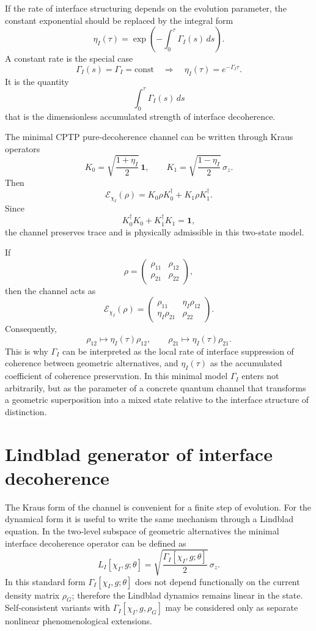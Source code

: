 \documentclass[12pt,a4paper]{article}
\newcommand{\Id}{\mathbf 1}
\begin{document}
If the rate of interface structuring depends on the evolution parameter, the constant exponential should be replaced by the integral form
\[
\boxed{
\eta_I(\tau)
=
\exp\left(-\int_0^\tau \Gamma_I(s)\,ds\right).
}
\]
A constant rate is the special case
\[
\Gamma_I(s)=\Gamma_I=\mathrm{const}
\quad\Rightarrow\quad
\eta_I(\tau)=e^{-\Gamma_I\tau}.
\]
It is the quantity
\[
\int_0^\tau \Gamma_I(s)\,ds
\]
that is the dimensionless accumulated strength of interface decoherence.

The minimal CPTP pure-decoherence channel can be written through Kraus operators
\[
\boxed{
K_0=
\sqrt{\frac{1+\eta_I}{2}}\,\Id,
\qquad
K_1=
\sqrt{\frac{1-\eta_I}{2}}\,\sigma_z.
}
\]
Then
\[
\boxed{
\mathcal E_{\chi_I}(\rho)
=
K_0\rho K_0^\dagger+K_1\rho K_1^\dagger.
}
\]
Since
\[
K_0^\dagger K_0+K_1^\dagger K_1=\Id,
\]
the channel preserves trace and is physically admissible in this two-state model.

If
\[
\rho=
\begin{pmatrix}
\rho_{11} & \rho_{12}\\
\rho_{21} & \rho_{22}
\end{pmatrix},
\]
then the channel acts as
\[
\boxed{
\mathcal E_{\chi_I}(\rho)=
\begin{pmatrix}
\rho_{11} & \eta_I\rho_{12}\\
\eta_I\rho_{21} & \rho_{22}
\end{pmatrix}.
}
\]
Consequently,
\[
\boxed{
\rho_{12}\longmapsto \eta_I(\tau)\rho_{12},
\qquad
\rho_{21}\longmapsto \eta_I(\tau)\rho_{21}.
}
\]
This is why $\Gamma_I$ can be interpreted as the local rate of interface suppression of coherence between geometric alternatives, and $\eta_I(\tau)$ as the accumulated coefficient of coherence preservation. In this minimal model $\Gamma_I$ enters not arbitrarily, but as the parameter of a concrete quantum channel that transforms a geometric superposition into a mixed state relative to the interface structure of distinction.

\section{Lindblad generator of interface decoherence}

The Kraus form of the channel is convenient for a finite step of evolution. For the dynamical form it is useful to write the same mechanism through a Lindblad equation. In the two-level subspace of geometric alternatives the minimal interface decoherence operator can be defined as
\[
\boxed{
L_I[\chi_I,g;\theta]
=
\sqrt{\frac{\Gamma_I[\chi_I,g;\theta]}{2}}\,\sigma_z.
}
\]
In this standard form $\Gamma_I[\chi_I,g;\theta]$ does not depend functionally on the current density matrix $\rho_G$; therefore the Lindblad dynamics remains linear in the state. Self-consistent variants with $\Gamma_I[\chi_I,g,\rho_G]$ may be considered only as separate nonlinear phenomenological extensions.
\end{document}
